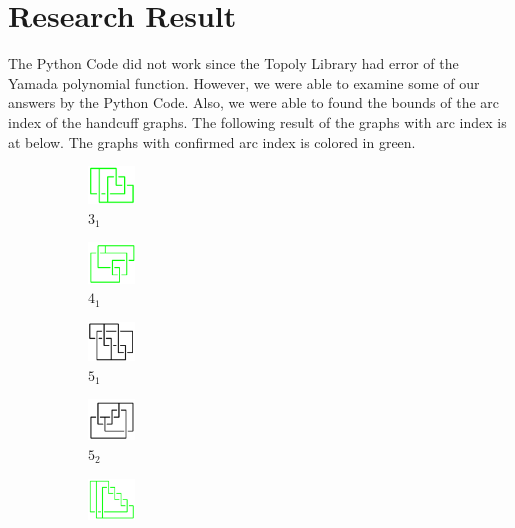 \documentclass{article}
\theoremstyle{definition}
\theoremstyle{theorem}
\theoremstyle{proposition}
\theoremstyle{corollary}
\begin{document}
\section{Research Result}
The Python Code did not work since the Topoly Library had error of the Yamada polynomial function. However, we were able to examine some of our answers by the Python Code. Also, we were able to found the bounds of the arc index of the handcuff graphs. The following result of the graphs with arc index is at below. The graphs with confirmed arc index is colored in green.\\
  \begin{figure}[H]
    \begin{subfigure}{0.075\textwidth}
    \includegraphics[width=1.25cm]{../Midterm_Poster/grid_diagram/theta_3_1.png}
    \caption{$3_1$} 
    \end{subfigure}
    \begin{subfigure}{0.075\textwidth}
    \includegraphics[width=1.25cm]{../Midterm_Poster/grid_diagram/theta_4_1.png}
    \caption{$4_1$} 
    \end{subfigure}
    \begin{subfigure}{0.075\textwidth}
    \includegraphics[width=1.25cm]{../Midterm_Poster/grid_diagram/theta_5_1.png}
    \caption{$5_1$}
    \end{subfigure}
    \begin{subfigure}{0.075\textwidth}
    \includegraphics[width=1.25cm]{../Midterm_Poster/grid_diagram/theta_5_2.png}
    \caption{$5_2$} 
    \end{subfigure}
    \begin{subfigure}{0.075\textwidth}
    \includegraphics[width=1.25cm]{../Midterm_Poster/grid_diagram/theta_5_3.png}

\end{subfigure}
\end{figure}
\end{document}

